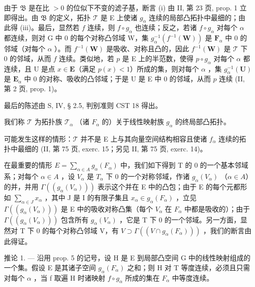 由于 \(\mathfrak{B}\) 是在比 \(>0\) 的位似下不变的滤子基，断言 (i) 由 II, 第 23 页, prop. 1 立即得出。由 \(\mathfrak{B}\) 的定义，拓扑 \(\mathcal{T}\) 是 E 上使诸 \(g_{\alpha}\) 连续的局部凸拓扑中最细的；由此得 (iii)。最后，显然若 \(f\) 连续，则 \(f \circ g_{\alpha}\) 也连续；反之，若诸 \(f \circ g_{\alpha}\) 对每个 \(\alpha\) 都连续，则对 G 中 0 的每个对称凸邻域 W，集 \(g_{\alpha}^{-1}(f^{-1}(\mathbf{W}))\) 是 \(\mathbf{F}_{\alpha}\) 中 0 的邻域（对每个 \(\alpha\) ）。而 \(f^{-1}(\mathbf{W})\) 是吸收、对称且凸的，因此 \(f^{-1}(\mathbf{W})\) 是 \(\mathcal{T}\) 下 0 的邻域，从而 \(f\) 连续。类似地，若 \(p\) 是 E 上的半范数，使得 \(p \circ g_{\alpha}\) 对每个 \(\alpha\) 都连续，且 U 是点 \(x \in \mathbf{E}\)（满足 \(p(x) < 1\)）所成的集，则对每个 \(\alpha\) ，集 \(g_{\alpha}^{-1}(\mathbf{U})\) 是 \(\mathbf{E}_{\alpha}\) 中 0 的对称、吸收的凸邻域；于是 U 是 E 中 0 的邻域，从而 \(p\) 连续 (II, 第 2 页, prop. 1)。

最后的陈述由 S, IV, § 2.5, 判别准则 CST 18 得出。

我们称 \(\mathcal{T}\) 为拓扑族 \(\mathcal{T}_{\alpha}\) （诸 \(F_{\alpha}\) 的）关于线性映射族 \(g_{\alpha}\) 的终局部凸拓扑。

可能发生这样的情形：\(\mathcal{T}\) 并不是 E 上与其向量空间结构相容且使诸 \(f_{\alpha}\) 连续的拓扑中最细的 (II, 第 75 页, exerc. 15；另见 II, 第 75 页, exerc. 14)。

在最重要的情形 \(E = \sum_{\alpha \in A} g_{\alpha}(F_{\alpha})\) 中，我们如下得到 T 的 0 的一个基本邻域系；对每个 \(\alpha \in A\) ，设 \(V_{\alpha}\) 是 \(T_{\alpha}\) 下 0 的一个对称邻域，作诸 \(g_{\alpha}(V_{\alpha})\) （\(\alpha \in A\)）的并，并用 \(\Gamma((g_{\alpha}(V_{\alpha})))\) 表示这个并在 E 中的凸包；由于 E 的每个元都形如 \(\sum_{\alpha \in J} x_{\alpha}\) ，其中 J 是 I 的有限子集且 \(x_{\alpha} \in g_{\alpha}(F_{\alpha})\) ，立见 \(\Gamma((g_{\alpha}(V_{\alpha})))\) 是 E 中的吸收对称凸集（每个 \(V_{\alpha}\) 在 \(F_{\alpha}\) 中都是吸收的）；由于 \(\Gamma((g_{\alpha}(V_{\alpha})))\) 包含所有 \(g_{\alpha}(V_{\alpha})\) ，它是 T 下 0 的一个邻域。另一方面，显然对 T 下 0 的每个对称凸邻域 V，有 \(V \supset \Gamma((V \cap g_{\alpha}(F_{\alpha})))\) ，我们的断言由此得证。

推论 1. --- 沿用 prop. 5 的记号，设 H 是 E 到局部凸空间 G 中的线性映射组成的一个集。假设 E 是其诸子空间 \(g_{\alpha}(F_{\alpha})\) 之和；则 H 对 T 等度连续，必须且只需对每个 \(\alpha\) ，当 f 取遍 H 时诸映射 \(f \circ g_{\alpha}\) 所成的集在 \(F_{\alpha}\) 中等度连续。

